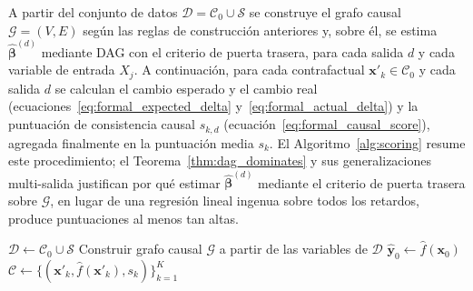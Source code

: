 \documentclass[12pt]{report} %
\begin{document}
A partir del conjunto de datos $\mathcal{D} = \mathcal{C}_0 \cup \mathcal{S}$ se construye el grafo causal $\mathcal{G} = (V, E)$ según las reglas de construcción anteriores y, sobre él, se estima $\widehat{\boldsymbol{\beta}}^{(d)}$ mediante DAG con el criterio de puerta trasera, para cada salida $d$ y cada variable de entrada $X_j$. A continuación, para cada contrafactual $\mathbf{x}'_k \in \mathcal{C}_0$ y cada salida $d$ se calculan el cambio esperado y el cambio real (ecuaciones~\eqref{eq:formal_expected_delta} y~\eqref{eq:formal_actual_delta}) y la puntuación de consistencia causal $s_{k,d}$ (ecuación~\eqref{eq:formal_causal_score}), agregada finalmente en la puntuación media $s_k$. El Algoritmo~\ref{alg:scoring} resume este procedimiento; el Teorema~\ref{thm:dag_dominates} y sus generalizaciones multi-salida justifican por qué estimar $\widehat{\boldsymbol{\beta}}^{(d)}$ mediante el criterio de puerta trasera sobre $\mathcal{G}$, en lugar de una regresión lineal ingenua sobre todos los retardos, produce puntuaciones al menos tan altas.

\begin{algorithm}[H]
    \caption{Evaluación causal de contrafactuales}
    \label{alg:scoring}
    $\mathcal{D} \leftarrow \mathcal{C}_0 \cup \mathcal{S}$\;
    Construir grafo causal $\mathcal{G}$ a partir de las variables de $\mathcal{D}$\;
    $\hat{\mathbf{y}}_0 \leftarrow \hat{f}(\mathbf{x}_0)$\;
    $\mathcal{C} \leftarrow \{(\mathbf{x}'_k, \hat{f}(\mathbf{x}'_k), s_k)\}_{k=1}^{K}$\;
\end{algorithm}
\end{document}
